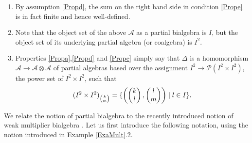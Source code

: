 \begin{Rem}\begin{enumerate}
\item By assumption \ref{Propd}, the sum on the right hand side in condition \ref{Prope} is in fact finite and hence well-defined. 
\item Note that the object set of the above $\mathscr{A}$ as a partial bialgebra is $I$, but the object set of its underlying partial algebra (or coalgebra) is $I^2$.
\item Properties \ref{Propa},\ref{Propd} and \ref{Prope} simply say that $\Delta$ is a homomorphism $\mathscr{A}\rightarrow \mathscr{A}\otimes \mathscr{A}$ of partial algebras based over the assignment $I^2\rightarrow \mathscr{P}(I^2\times I^2)$, the power set of $I^2\times I^2$, such that \[(I^2\times I^2)_{{\tiny \begin{pmatrix} k\\m \end{pmatrix}}} = \{\left(\begin{pmatrix} k \\ l \end{pmatrix},\begin{pmatrix} l \\ m \end{pmatrix}\right)\mid l\in I\}.\] 
\end{enumerate}
\end{Rem}




We relate the notion of partial bialgebra to the recently introduced notion of weak multiplier bialgebra \cite{Boh1}. Let us first introduce the following notation, using the notion introduced in Example \ref{ExaMult}.2.

